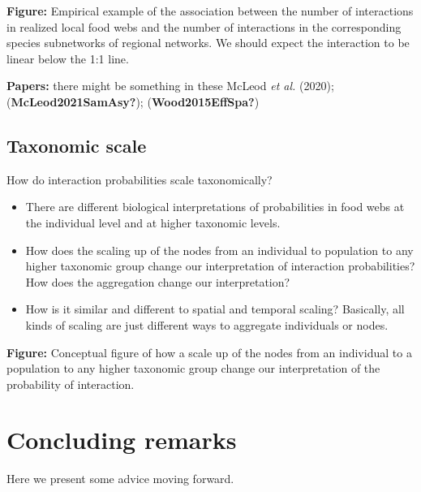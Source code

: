 \documentclass[10pt,oneside]{article}
\begin{document}
\textbf{Figure:} Empirical example of the association between the number
of interactions in realized local food webs and the number of
interactions in the corresponding species subnetworks of regional
networks. We should expect the interaction to be linear below the 1:1
line.

\textbf{Papers:} there might be something in these McLeod \emph{et al.}
(2020); (\textbf{McLeod2021SamAsy?}); (\textbf{Wood2015EffSpa?})

\hypertarget{taxonomic-scale}{%
\subsection{Taxonomic scale}\label{taxonomic-scale}}

How do interaction probabilities scale taxonomically?

\begin{itemize}
\tightlist
\item
  There are different biological interpretations of probabilities in
  food webs at the individual level and at higher taxonomic levels.
\item
  How does the scaling up of the nodes from an individual to population
  to any higher taxonomic group change our interpretation of interaction
  probabilities? How does the aggregation change our interpretation?
\item
  How is it similar and different to spatial and temporal scaling?
  Basically, all kinds of scaling are just different ways to aggregate
  individuals or nodes.
\end{itemize}

\textbf{Figure:} Conceptual figure of how a scale up of the nodes from
an individual to a population to any higher taxonomic group change our
interpretation of the probability of interaction.

\hypertarget{concluding-remarks}{%
\section{Concluding remarks}\label{concluding-remarks}}

Here we present some advice moving forward.
\end{document}
